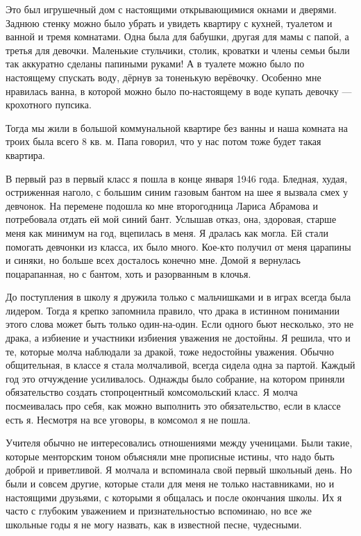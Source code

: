Это был игрушечный дом с настоящими открывающимися окнами и дверями.
Заднюю стенку можно было убрать и увидеть квартиру с кухней, туалетом и ванной и тремя комнатами.
Одна была для бабушки, другая для мамы с папой, а третья для девочки.
Маленькие стульчики, столик, кроватки и члены семьи были так аккуратно сделаны папиными руками! 
А в туалете можно было по настоящему спускать воду, дёрнув за тоненькую верёвочку.
Особенно мне нравилась ванна, в которой можно было по-настоящему в воде купать девочку --- крохотного пупсика.

Тогда мы жили в большой коммунальной квартире без ванны и наша комната на троих была всего 8 кв. м.
Папа говорил, что у нас потом тоже будет такая квартира.

В первый раз в первый класс я пошла в конце января 1946 года.
Бледная, худая, остриженная наголо, с большим синим газовым бантом на шее я вызвала смех у девчонок.
На перемене подошла ко мне второгодница Лариса Абрамова и потребовала отдать ей мой синий бант.
Услышав отказ, она, здоровая, старше меня как минимум на год, вцепилась в меня.
Я дралась как могла.
Ей стали помогать девчонки из класса, их было много.
Кое-кто получил от меня царапины и синяки, но больше всех досталось конечно мне.
Домой я вернулась поцарапанная, но с бантом, хоть и разорванным в клочья.

До поступления в школу я дружила только с мальчишками и в играх всегда была лидером.
Тогда я крепко запомнила правило, что драка в истинном понимании этого слова может быть только один-на-один.
Если одного бьют несколько, это не драка, а избиение и участники избиения уважения не достойны.
Я решила, что и те, которые молча наблюдали за дракой, тоже недостойны уважения.
Обычно общительная, в классе я стала молчаливой, всегда сидела одна за партой.
Каждый год это отчуждение усиливалось.
Однажды было собрание, на котором приняли обязательство создать стопроцентный комсомольский класс.
Я молча посмеивалась про себя, как можно выполнить это обязательство, если в классе есть я.
Несмотря на все уговоры, в комсомол я не пошла.

Учителя обычно не интересовались отношениями между ученицами.
Были такие, которые менторским тоном объясняли мне прописные истины, что надо быть доброй и приветливой.
Я молчала и вспоминала свой первый школьный день.
Но были и совсем другие, которые стали для меня не только наставниками, но и настоящими друзьями, с которыми я общалась и после окончания школы.
Их я часто с глубоким уважением и признательностью вспоминаю, но все же школьные годы я не могу назвать, как в известной песне, чудесными.

